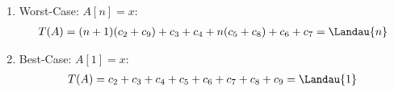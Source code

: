 \begin{solution}
\begin{enumerate}[label = (\alph*)]
\begin{enumerate}[label = \arabic*.]
    \item Worst-Case:
    $A[n] = x:$
    \begin{align*}
      T(A) = (n+1)(c_2 + c_9) + c_3 + c_4 + n(c_5 + c_8) + c_6 + c_7 = \Landau{n}
    \end{align*}
  
    \item Best-Case:
    $A[1] = x:$
    \begin{align*}
      T(A) = c_2 + c_3 + c_4 + c_5 + c_6 + c_7 + c_8 + c_9 = \Landau{1}
    \end{align*}
  
  \end{enumerate}

\end{enumerate}

\end{solution}



